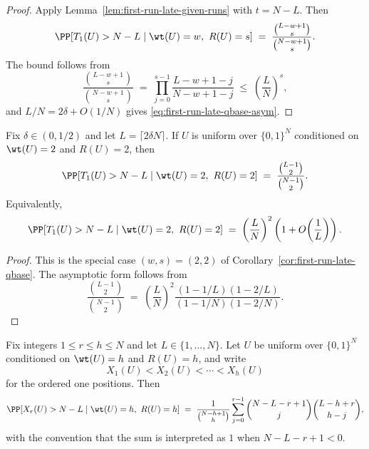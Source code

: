 \begin{proof}
Apply Lemma~\ref{lem:first-run-late-given-runs} with $t=N-L$.
Then
\[
\PP[T_1(U)>N-L \mid \wt(U)=w,\ R(U)=s]
\;=\;
\frac{\binom{L-w+1}{s}}{\binom{N-w+1}{s}}.
\]
The bound follows from
\[
\frac{\binom{L-w+1}{s}}{\binom{N-w+1}{s}}
\;=\;
\prod_{j=0}^{s-1}\frac{L-w+1-j}{N-w+1-j}
\;\le\;
\left(\frac{L}{N}\right)^s,
\]
and $L/N = 2\delta + O(1/N)$ gives \eqref{eq:first-run-late-qbase-asym}.
\end{proof}

\begin{corollary}
\label{cor:first-run-late-two-run}
Fix $\delta\in(0,1/2)$ and let $L=\lceil 2\delta N\rceil$.
If $U$ is uniform over $\{0,1\}^N$ conditioned on $\wt(U)=2$ and $R(U)=2$, then
\begin{equation}
\label{eq:first-run-late-two-run}
\PP[T_1(U)>N-L \mid \wt(U)=2,\ R(U)=2]
\;=\;
\frac{\binom{L-1}{2}}{\binom{N-1}{2}}.
\end{equation}
Equivalently,
\begin{equation}
\label{eq:first-run-late-two-run-asym}
\PP[T_1(U)>N-L \mid \wt(U)=2,\ R(U)=2]
\;=\;
\left(\frac{L}{N}\right)^2
\left(1+O\!\left(\frac{1}{L}\right)\right).
\end{equation}
\end{corollary}

\begin{proof}
This is the special case $(w,s)=(2,2)$ of Corollary~\ref{cor:first-run-late-qbase}. The asymptotic form follows from
\[
\frac{\binom{L-1}{2}}{\binom{N-1}{2}}
\;=\;
\left(\frac{L}{N}\right)^2
\frac{(1-1/L)(1-2/L)}{(1-1/N)(1-2/N)}.
\]
\end{proof}

\begin{corollary}
\label{cor:isolated-order-late}
Fix integers \(1\le r\le h\le N\) and let \(L\in\{1,\dots,N\}\).
Let \(U\) be uniform over \(\{0,1\}^N\) conditioned on \(\wt(U)=h\) and \(R(U)=h\), and write
\[
X_1(U)<X_2(U)<\cdots<X_h(U)
\]
for the ordered one positions.
Then
\begin{equation}
\label{eq:isolated-order-late}
\PP[X_r(U)>N-L \mid \wt(U)=h,\ R(U)=h]
\;=\;
\frac{1}{\binom{N-h+1}{h}}
\sum_{j=0}^{r-1}
\binom{N-L-r+1}{j}\binom{L-h+r}{h-j},
\end{equation}
with the convention that the sum is interpreted as \(1\) when \(N-L-r+1<0\).
\end{corollary}


